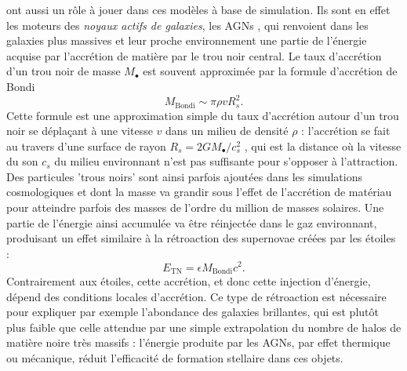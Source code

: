  ont aussi un rôle à jouer dans ces modèles à base de simulation. Ils sont en effet les moteurs des \textit{noyaux actifs de galaxies}, les AGNs , qui renvoient dans les galaxies plus massives et leur proche environnement une partie de l'énergie acquise par l'accrétion de matière par le trou noir central. Le taux d'accrétion d'un trou noir de masse $M_\bullet$ est souvent approximée par la formule d'accrétion de Bondi
\begin{equation}
M_\mathrm{Bondi}\sim \pi \rho v R_s^2.
\end{equation}
Cette formule est une approximation simple du taux d'accrétion autour d'un trou noir se déplaçant à une vitesse $v$ dans un milieu de densité $\rho$ : l'accrétion se fait au travers d'une surface de rayon $R_s=2GM_\bullet/c_s^2$ , qui est la distance où la vitesse du son $c_s$ du milieu environnant n'est pas suffisante pour s'opposer à l'attraction. Des particules 'trous noirs' sont ainsi parfois ajoutées dans les simulations cosmologiques et dont la masse va grandir sous l'effet de l'accrétion de matériau pour atteindre parfois des masses de l'ordre du million de masses solaires. Une partie de l'énergie ainsi accumulée va être réinjectée dans le gaz environnant, produisant un effet similaire à la rétroaction des supernovae créées par les étoiles :
\begin{equation}
E_{\mathrm{TN}}=\epsilon M_\mathrm{Bondi} c^2.
\end{equation}
Contrairement aux étoiles, cette accrétion, et donc cette injection d'énergie, dépend des conditions locales d'accrétion. Ce type de rétroaction est nécessaire pour expliquer par exemple l'abondance des galaxies brillantes, qui est plutôt plus faible que celle attendue par une simple extrapolation du nombre de halos de matière noire très massifs : l'énergie produite par les AGNs, par effet thermique ou mécanique, réduit l'efficacité de formation stellaire dans ces objets.

